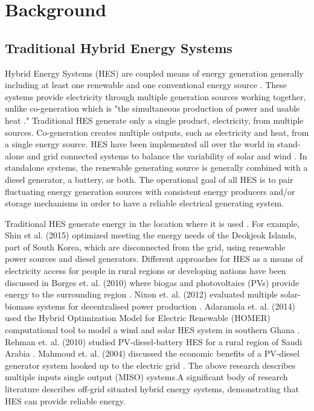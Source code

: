 \documentclass[12pt]{UIdahoMastersThesis}
\begin{document}
\chapter{Background}
\section{Traditional Hybrid Energy Systems}
Hybrid Energy Systems (HES) are coupled means of energy generation generally including at least one renewable and one conventional energy source \cite {Ibrahim2011}. These systems provide electricity through multiple generation sources working together, unlike co-generation which is "the simultaneous production of power and usable heat \cite{Rosen2005}." Traditional HES generate only a single product, electricity, from multiple sources. Co-generation creates multiple outputs, such as electricity and heat, from a single energy source. HES have been implemented all over the world in stand-alone and grid connected systems to balance the variability of solar and wind \cite {Garcia2015, Qi2014, Shin2015, Nixon2012, Adaramola2014, Goodbody2013, BorgesNeto2010, McGowan1996}. In standalone systems, the renewable generating source is generally combined with a diesel generator, a battery, or both. The operational goal of all HES is to pair fluctuating energy generation sources with consistent energy producers and/or storage mechanisms in order to have a reliable electrical generating system.

Traditional HES generate energy in the location where it is used \cite {Shin2015, Nixon2012, Adaramola2014, Goodbody2013, McGowan1996}. For example, Shin et al. (2015) optimized meeting the energy needs of the Deokjeok Islands, part of South Korea, which are disconnected from the grid, using renewable power sources and diesel generators. Different approaches for HES as a means of electricity access for people in rural regions or developing nations have been discussed in Borges et. al. (2010) where biogas and photovoltaics (PVs) provide energy to the surrounding region \cite{BorgesNeto2010}. Nixon et. al. (2012) evaluated multiple solar-biomass systems for decentralised power production \cite{Nixon2012}. Adaramola et. al. (2014) used the Hybrid Optimization Model for Electric Renewable (HOMER) computational tool to model a wind and solar HES system in southern Ghana \cite{Adaramola2014}. Rehman et. al. (2010) studied PV-diesel-battery HES for a rural region of Saudi Arabia \cite{Rehman2010}. Mahmoud et. al. (2004) discussed the economic benefits of a PV-diesel generator system hooked up to the electric grid \cite {Mahmoud2004}. The above research describes multiple inputs single output (MISO) systems\cite{Garcia2013}.A significant body of research literature describes off-grid situated hybrid energy systems, demonstrating that HES can provide reliable energy.
\end{document}
